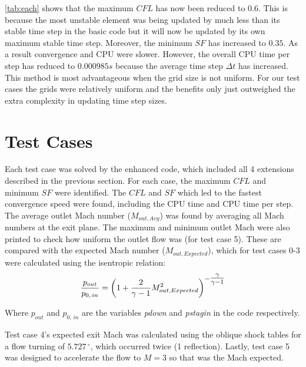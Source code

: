 \documentclass[12pt, a4paper]{article}
\begin{document}
\autoref{tab:each} shows that the maximum $ CFL $ has now been reduced to $ 0.6 $. This is because the most unstable element was being updated by much less than its stable time step in the basic code but it will now be updated by its own maximum stable time step. Moreover, the minimum $SF$ has increased to $0.35$. As a result convergence and CPU were slower. However, the overall CPU time per step has reduced to $0.000985s$ because the average time step $\Delta t$ has increased. This method is most advantageous when the grid size is not uniform. For our test cases the grids were relatively uniform and the benefits only just outweighed the extra complexity in updating time step sizes.

\section{Test Cases}
Each test case was solved by the enhanced code, which included all 4 extensions described in the previous section. For each case, the maximum $CFL$ and minimum $SF$ were identified. The $CFL$ and $SF$ which led to the fastest convergence speed were found, including the CPU time and CPU time per step. The average outlet Mach number ($M_{out, Avg}$) was found by averaging all Mach numbers at the exit plane. The maximum and minimum outlet Mach were also printed to check how uniform the outlet flow was (for test case 5). These are compared with the expected Mach number ($M_{out, Expected}$), which for test cases 0-3 were calculated using the isentropic relation:
\begin{equation*}
	\dfrac{p_{out}}{p_{0,\,in}} = \left( 1+\dfrac{2}{\gamma-1}M_{out, Expected}^2 \right) ^{\mbox{\footnotesize $-$\large $\frac{\gamma}{\gamma-1}$}}
\end{equation*}

Where $p_{out}$ and $p_{0,\,in}$ are the variables \textit{pdown} and \textit{pstagin} in the code respectively. 

Test case 4's expected exit Mach was calculated using the oblique shock tables for a flow turning of $5.727\,^{\circ}$, which occurred twice (1 reflection). Lastly, test case 5 was designed to accelerate the flow to $M=3$ so that was the Mach expected.
\end{document}
